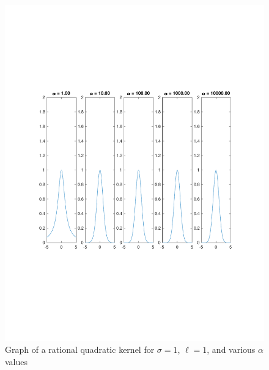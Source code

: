 \documentclass{article}
\begin{document}
\begin{figure}[H]
  \centering
  \caption{Graph of a rational quadratic kernel for $\sigma = 1$, $\ell = 1$, and various $\alpha$ values}
  \label{fig:rqk}
  \includegraphics[trim={0 7cm 0 7cm},clip,keepaspectratio=true,scale=0.5]{rqk}
\end{figure}
\end{document}
